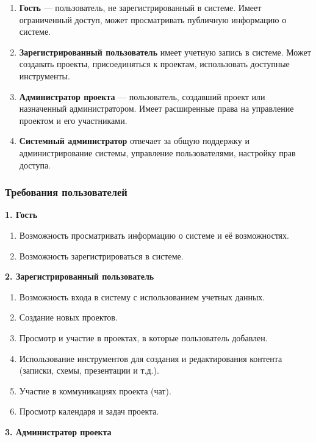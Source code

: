 \begin{enumerate}[wide=12.5mm, leftmargin=12.5mm]
    \item \textbf{Гость} --- пользователь, не зарегистрированный в системе. Имеет ограниченный доступ, может просматривать публичную информацию о системе.
    \item \textbf{Зарегистрированный пользователь} имеет учетную запись в системе. Может создавать проекты, присоединяться к проектам, использовать доступные инструменты.
    \item \textbf{Администратор проекта} --- пользователь, создавший проект или назначенный администратором. Имеет расширенные права на управление проектом и его участниками.
    \item \textbf{Системный администратор} отвечает за общую поддержку и администрирование системы, управление пользователями, настройку прав доступа.
\end{enumerate}

\subsubsection{Требования пользователей}

\textbf{1. Гость}

\begin{enumerate}[wide=12.5mm, leftmargin=12.5mm]
    \item Возможность просматривать информацию о системе и её возможностях.
    \item Возможность зарегистрироваться в системе.
\end{enumerate}

\textbf{2. Зарегистрированный пользователь}

\begin{enumerate}[wide=12.5mm, leftmargin=12.5mm]
    \item Возможность входа в систему с использованием учетных данных.
    \item Создание новых проектов.
    \item Просмотр и участие в проектах, в которые пользователь добавлен.
    \item Использование инструментов для создания и редактирования контента (записки, схемы, презентации и т.д.).
    \item Участие в коммуникациях проекта (чат).
    \item Просмотр календаря и задач проекта.
\end{enumerate}

\textbf{3. Администратор проекта}

